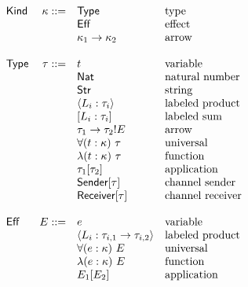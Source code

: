 \documentclass[12pt]{article}
\begin{document}
\[
\begin{array}{l r l l}
\textsf{Kind} & \kappa ::= & \textsf{Type}                     & \text{type} \\
              &            & \textsf{Eff}                      & \text{effect} \\
              &            & \kappa_1 \rightarrow \kappa_2     & \text{arrow} \\
\\
\textsf{Type} &   \tau ::= & t                                 & \text{variable} \\
              &            & \textsf{Nat}                      & \text{natural number} \\
              &            & \textsf{Str}                      & \text{string} \\
              &            & \langle L_i : \tau_i \rangle      & \text{labeled product} \\
              &            & [ L_i : \tau_i ]                  & \text{labeled sum} \\
              &            & \tau_1 \rightarrow \tau_2!E       & \text{arrow} \\
              &            & \forall (t : \kappa) \ \tau       & \text{universal} \\
              &            & \lambda (t : \kappa) \ \tau       & \text{function} \\
              &            & \tau_1[\tau_2]                    & \text{application} \\
              &            & \textsf{Sender}[\tau]             & \text{channel sender} \\
              &            & \textsf{Receiver}[\tau]           & \text{channel receiver} \\
\\
\textsf{Eff}  &      E ::= & e                                 & \text{variable} \\
              &            & \langle L_i :
                             \tau_{i,1}
                             \rightarrow \tau_{i,2}
                             \rangle                           & \text{labeled product} \\
              &            & \forall (e : \kappa) \ E          & \text{universal} \\
              &            & \lambda (e : \kappa) \ E          & \text{function} \\
              &            & E_1[E_2]                          & \text{application} \\

\end{array}\]
\end{document}
